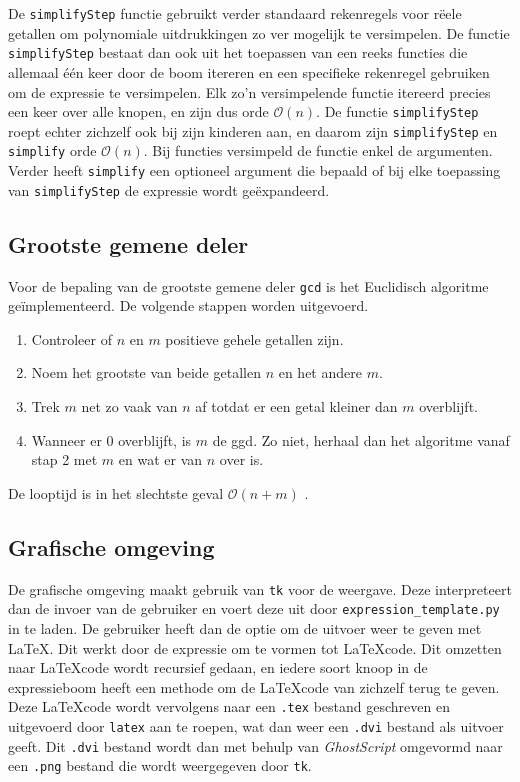 \documentclass[a4paper]{article}
\newcommand{\ttt}[1]{\texttt{#1}}
\begin{document}
De \ttt{simplifyStep} functie gebruikt verder standaard rekenregels voor r\"eele getallen om polynomiale uitdrukkingen zo ver mogelijk te versimpelen. De functie \ttt{simplifyStep} bestaat dan ook uit het toepassen van een reeks functies die allemaal \'e\'en keer door de boom itereren en een specifieke rekenregel gebruiken om de expressie te versimpelen. Elk zo'n versimpelende functie itereerd precies een keer over alle knopen, en zijn dus orde $\mathcal O(n)$. De functie \ttt{simplifyStep} roept echter zichzelf ook bij zijn kinderen aan, en daarom zijn \ttt{simplifyStep} en \ttt{simplify} orde $\mathcal O(n)$. Bij functies versimpeld de functie enkel de argumenten. Verder heeft \ttt{simplify} een optioneel argument die bepaald of bij elke toepassing van \ttt{simplifyStep} de expressie wordt ge\"expandeerd. 

\subsection{Grootste gemene deler}
Voor de bepaling van de grootste gemene deler \ttt{gcd} is het Euclidisch algoritme ge\"implementeerd. De volgende stappen worden uitgevoerd.
\begin{enumerate}
\item Controleer of $n$ en $m$ positieve gehele getallen zijn.
\item Noem het grootste van beide getallen $n$ en het andere $m$.
\item Trek $m$ net zo vaak van $n$ af totdat er een getal kleiner dan $m$ overblijft.
\item Wanneer er $0$ overblijft, is $m$ de ggd. Zo niet, herhaal dan het algoritme vanaf stap 2 met $m$ en wat er van $n$ over is.
\end{enumerate}
De looptijd is in het slechtste geval $\mathcal{O}(n+m)$ \cite{gcd}.

\subsection{Grafische omgeving}
De grafische omgeving maakt gebruik van  \ttt{tk} voor de weergave. Deze interpreteert dan de invoer van de gebruiker en voert deze uit door \ttt{expression\_template.py} in te laden. De gebruiker heeft dan de optie om de uitvoer weer te geven met \LaTeX. Dit werkt door de expressie om te vormen tot \LaTeX code. Dit omzetten naar \LaTeX code wordt recursief gedaan, en iedere soort knoop in de expressieboom heeft een methode om de \LaTeX code van zichzelf terug te geven. Deze \LaTeX code wordt vervolgens naar een \ttt{.tex} bestand geschreven en uitgevoerd door \ttt{latex} aan te roepen, wat dan weer een \ttt{.dvi} bestand als uitvoer geeft. Dit \ttt{.dvi} bestand wordt dan met behulp van \textit{GhostScript} omgevormd naar een \ttt{.png} bestand die wordt weergegeven door \ttt{tk}. 
\end{document}
